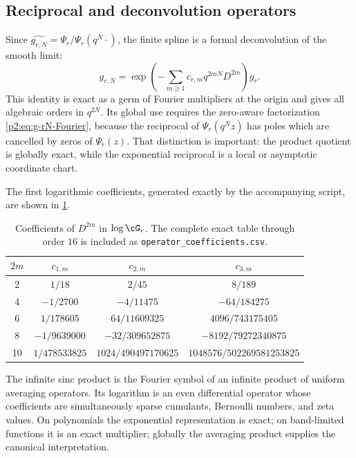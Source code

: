 \documentclass[11pt,oneside]{article}
\theoremstyle{definition}
\begin{document}
\subsection{Reciprocal and deconvolution operators}

Since $\widehat{g_{r,N}}=\Psi_r/\Psi_r(q^N\cdot)$, the finite spline is a
formal deconvolution of the smooth limit:
\begin{equation}
 g_{r,N}
 =\exp\!\left(-\sum_{m\ge1}c_{r,m}q^{2mN}D^{2m}\right)g_r. \label{p2:eq:formal-deconvolution}
\end{equation}
This identity is exact as a germ of Fourier multipliers at the origin and gives
all algebraic orders in $q^{2N}$.  Its global use requires the zero-aware
factorization \eqref{p2:eq:g-rN-Fourier}, because the reciprocal of
$\Psi_r(q^Nz)$ has poles which are cancelled by zeros of $\Psi_r(z)$.
That distinction is important: the product quotient is globally exact, while
the exponential reciprocal is a local or asymptotic coordinate chart.

The first logarithmic coefficients, generated exactly by the accompanying
script, are shown in \cref{p2:tab:operator-coefficients}.

\begin{table}[htbp]
\centering
\small
\begin{tabular}{@{}c c c c@{}}
\toprule
$2m$ & $c_{1,m}$ & $c_{2,m}$ & $c_{3,m}$\\
\midrule
2 & $1/18$ & $2/45$ & $8/189$\\
4 & $-1/2700$ & $-4/11475$ & $-64/184275$\\
6 & $1/178605$ & $64/11609325$ & $4096/743175405$\\
8 & $-1/9639000$ & $-32/309652875$ & $-8192/79272340875$\\
10 & $1/478533825$ & $1024/490497170625$ & $1048576/502269581253825$\\
\bottomrule
\end{tabular}
\caption{Coefficients of $D^{2m}$ in $\log\cG_r$.  The complete exact table
through order $16$ is included as \texttt{operator\_coefficients.csv}.}
\label{p2:tab:operator-coefficients}
\end{table}

\begin{resultbox}
The infinite sinc product is the Fourier symbol of an infinite product of
uniform averaging operators.  Its logarithm is an even differential operator
whose coefficients are simultaneously sparse cumulants, Bernoulli numbers,
and zeta values.  On polynomials the exponential representation is exact; on
band-limited functions it is an exact multiplier; globally the averaging
product supplies the canonical interpretation.
\end{resultbox}
\end{document}
